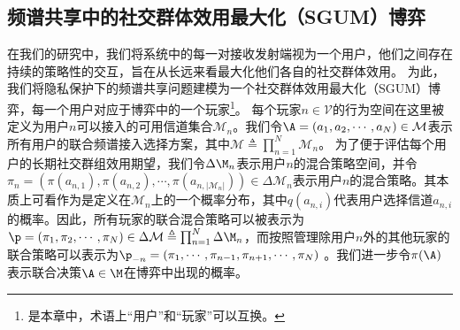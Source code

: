 \subsection{频谱共享中的社交群体效用最大化（SGUM）博弈}\label{sec:SGUM}
在我们的研究中，我们将系统中的每一对接收发射端视为一个用户，他们之间存在持续的策略性的交互，旨在从长远来看最大化他们各自的社交群体效用。
为此，我们将隐私保护下的频谱共享问题建模为一个社交群体效用最大化（SGUM）博弈，每一个用户对应于博弈中的一个玩家\footnote{是本章中，术语上“用户”和“玩家”可以互换。}。
每个玩家$n\in\mathcal{V}$的行为空间在这里被定义为用户$n$可以接入的可用信道集合$\mathcal{M}_n$。我们令$\A=(a_1,a_2,\cdots,a_N)\in\mathcal{M}$表示所有用户的联合频谱接入选择方案，其中$\mathcal{M}\triangleq\prod_{n=1}^N\mathcal{M}_n$。
为了便于评估每个用户的长期社交群组效用期望，我们令$\Delta\M_n$表示用户$n$的混合策略空间，并令$\pi_n=\left(\pi(a_{n,1}),\pi(a_{n,2}),\cdots,\pi(a_{n,|\mathcal{M}_n|})\right)\in\Delta\mathcal{M}_n$表示用户$n$的混合策略。其本质上可看作为是定义在$\mathcal{M}_n$上的一个概率分布，其中$q(a_{n,i})$代表用户选择信道$a_{n,i}$的概率。因此，所有玩家的联合混合策略可以被表示为$\p=(\pi_1,\pi_2,\cdots,\pi_N)\in\Delta\mathcal{M}\triangleq\prod_{n=1}^N\Delta\M_n$，而按照管理除用户$n$外的其他玩家的联合策略可以表示为$\p_{-n}=(\pi_1,\cdots,\pi_{n-1},\pi_{n+1},\cdots,\pi_N)$ 。我们进一步令$\pi(\A)$表示联合决策$\A\in\M$在博弈中出现的概率。



